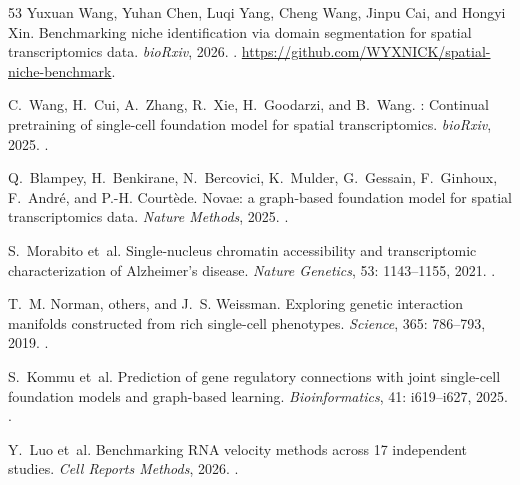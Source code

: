 \documentclass[fleqn,10pt,lineno]{wlpeerj}  %
\begin{document}
\begin{thebibliography}{53}
Yuxuan Wang, Yuhan Chen, Luqi Yang, Cheng Wang, Jinpu Cai, and Hongyi Xin.
\newblock Benchmarking niche identification via domain segmentation for spatial
  transcriptomics data.
\newblock \emph{bioRxiv}, 2026.
\newblock {}.
\newblock \url{https://github.com/WYXNICK/spatial-niche-benchmark}.

C.~Wang, H.~Cui, A.~Zhang, R.~Xie, H.~Goodarzi, and B.~Wang.
: Continual pretraining of single-cell foundation
  model for spatial transcriptomics.
\newblock \emph{bioRxiv}, 2025.
\newblock {}.

Q.~Blampey, H.~Benkirane, N.~Bercovici, K.~Mulder, G.~Gessain, F.~Ginhoux,
  F.~Andr{\'e}, and P.-H. Court{\`e}de.
\newblock Novae: a graph-based foundation model for spatial transcriptomics
  data.
\newblock \emph{Nature Methods}, 2025.
\newblock {}.

S.~Morabito et~al.
\newblock Single-nucleus chromatin accessibility and transcriptomic
  characterization of {Alzheimer's} disease.
\newblock \emph{Nature Genetics}, 53: 1143--1155, 2021.
\newblock {}.

T.~M. Norman, others, and J.~S. Weissman.
\newblock Exploring genetic interaction manifolds constructed from rich
  single-cell phenotypes.
\newblock \emph{Science}, 365: 786--793, 2019.
\newblock {}.

S.~Kommu et~al.
\newblock Prediction of gene regulatory connections with joint single-cell
  foundation models and graph-based learning.
\newblock \emph{Bioinformatics}, 41: i619--i627, 2025.
\newblock {}.

Y.~Luo et~al.
\newblock Benchmarking {RNA} velocity methods across 17 independent studies.
\newblock \emph{Cell Reports Methods}, 2026.
\newblock {}.

\end{thebibliography}
\end{document}
